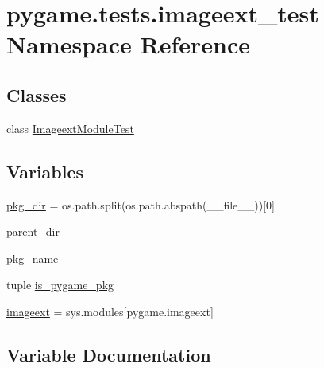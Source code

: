 \hypertarget{namespacepygame_1_1tests_1_1imageext__test}{}\section{pygame.\+tests.\+imageext\+\_\+test Namespace Reference}
\label{namespacepygame_1_1tests_1_1imageext__test}
\subsection*{Classes}
\begin{DoxyCompactItemize}
\item 
class \hyperlink{classpygame_1_1tests_1_1imageext__test_1_1_imageext_module_test}{Imageext\+Module\+Test}
\end{DoxyCompactItemize}
\subsection*{Variables}
\begin{DoxyCompactItemize}
\item 
\hyperlink{namespacepygame_1_1tests_1_1imageext__test_ab9310fa76d5b399d51e5a44ea6d697d3}{pkg\+\_\+dir} = os.\+path.\+split(os.\+path.\+abspath(\+\_\+\+\_\+file\+\_\+\+\_\+))\mbox{[}0\mbox{]}
\item 
\hyperlink{namespacepygame_1_1tests_1_1imageext__test_abdc1fa4497b6226be34b8c03b554c849}{parent\+\_\+dir}
\item 
\hyperlink{namespacepygame_1_1tests_1_1imageext__test_a8b03b5d2531cad39a4b02c1495503018}{pkg\+\_\+name}
\item 
tuple \hyperlink{namespacepygame_1_1tests_1_1imageext__test_a08b91b1319f8da005921979dbd1b79af}{is\+\_\+pygame\+\_\+pkg}
\item 
\hyperlink{namespacepygame_1_1tests_1_1imageext__test_a2b17b8b08532f2b9fac7a74865a6c104}{imageext} = sys.\+modules\mbox{[}\textquotesingle{}pygame.\+imageext\textquotesingle{}\mbox{]}
\end{DoxyCompactItemize}


\subsection{Variable Documentation}
\mbox{\label{namespacepygame_1_1tests_1_1imageext__test_a2b17b8b08532f2b9fac7a74865a6c104}} 
